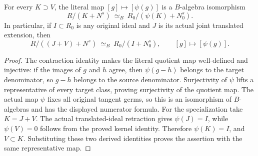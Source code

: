 \begin{theorem}
\label{hir:actual-tangent-cut-truncation-dictionary}
\leanok
For every $K\supset V$, the literal map $[g]\mapsto[\psi(g)]$ is a
$B$-algebra isomorphism
\[
 R/(K+N^s)\ \simeq_B\ R_0/(\psi(K)+N_0^s).
\]
In particular, if $I\subset R_0$ is any original ideal and $J$ is its
actual joint translated extension, then
\[
 R/((J+V)+N^s)\ \simeq_B\ R_0/(I+N_0^s),
 \qquad [g]\longmapsto[\psi(g)].
\]
\end{theorem}
\begin{proof}
The contraction identity makes the literal quotient map well-defined
and injective: if the images of $g$ and $h$ agree, then
$\psi(g-h)$ belongs to the target denominator, so $g-h$ belongs to
the source denominator. Surjectivity of $\psi$ lifts a representative
of every target class, proving surjectivity of the quotient map. The
actual map $\psi$ fixes all original tangent germs, so this is an
isomorphism of $B$-algebras and has the displayed numerator formula.
For the specialization take $K=J+V$. The actual translated-ideal
retraction gives $\psi(J)=I$, while $\psi(V)=0$ follows from the
proved kernel identity. Therefore $\psi(K)=I$, and $V\subset K$.
Substituting these two derived identities proves the assertion with
the same representative map.
\end{proof}

